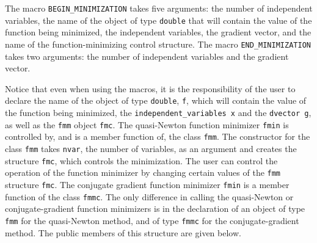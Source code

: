 \documentclass{admbmanual}
\begin{document}
The macro \texttt{BEGIN\_MINIMIZATION} takes five arguments: the number of
independent variables, the name of the object of type \texttt{double} that will
contain the value of the function being minimized, the independent variables,
the gradient vector, and the name of the function-minimizing control structure.
The macro \texttt{END\_MINIMIZATION} takes two arguments: the number of
independent variables and the gradient vector.

Notice that even when using the macros, it is the responsibility of the user to
declare the name of the object of type \texttt{double}, \texttt{f}, which will
contain the value of the function being minimized, the
\texttt{independent\_variables x} and the \texttt{dvector g}, as well as the
\texttt{fmm} object \texttt{fmc}. The quasi-Newton function minimizer
\texttt{fmin} is controlled by, and is a member function of, the class
\texttt{fmm}. The constructor for the class \texttt{fmm} takes \texttt{nvar},
the number of variables, as an argument and creates the structure \texttt{fmc},
which controls the minimization. The user can control the operation of the
function minimizer by changing certain values of the \texttt{fmm} structure
\texttt{fmc}. The conjugate gradient function minimizer \texttt{fmin} is a
member function of the class \texttt{fmmc}. The only difference in calling the
quasi-Newton or conjugate-gradient function minimizers is in the declaration of
an object of type \texttt{fmm} for the quasi-Newton method, and of type
\texttt{fmmc} for the conjugate-gradient method. The public members of this
structure are given below.
\end{document}
